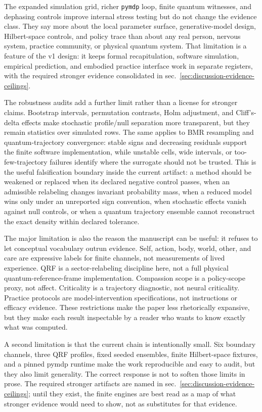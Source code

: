 \documentclass[
]{article}
\begin{document}
The expanded simulation grid, richer \texttt{pymdp} loop, finite quantum
witnesses, and dephasing controls improve internal stress testing but do
not change the evidence class. They say more about the local parameter
surface, generative-model design, Hilbert-space controls, and policy
trace than about any real person, nervous system, practice community, or
physical quantum system. That limitation is a feature of the v1 design:
it keeps formal recapitulation, software simulation, empirical
prediction, and embodied practice interface work in separate registers,
with the required stronger evidence consolidated in
sec.~\ref{sec:discussion-evidence-ceilings}.

The robustness audits add a further limit rather than a license for
stronger claims. Bootstrap intervals, permutation contrasts, Holm
adjustment, and Cliff's-delta effects make stochastic profile/null
separation more transparent, but they remain statistics over simulated
rows. The same applies to BMR resampling and quantum-trajectory
convergence: stable signs and decreasing residuals support the finite
software implementation, while unstable cells, wide intervals, or
too-few-trajectory failures identify where the surrogate should not be
trusted. This is the useful falsification boundary inside the current
artifact: a method should be weakened or replaced when its declared
negative control passes, when an admissible relabeling changes invariant
probability mass, when a reduced model wins only under an unreported
sign convention, when stochastic effects vanish against null controls,
or when a quantum trajectory ensemble cannot reconstruct the exact
density within declared tolerance.

The major limitation is also the reason the manuscript can be useful: it
refuses to let conceptual vocabulary outrun evidence. Self, action,
body, world, other, and care are expressive labels for finite channels,
not measurements of lived experience. QRF is a sector-relabeling
discipline here, not a full physical quantum-reference-frame
implementation. Compassion scope is a policy-scope proxy, not affect.
Criticality is a trajectory diagnostic, not neural criticality. Practice
protocols are model-intervention specifications, not instructions or
efficacy evidence. These restrictions make the paper less rhetorically
expansive, but they make each result inspectable by a reader who wants
to know exactly what was computed.

A second limitation is that the current chain is intentionally small.
Six boundary channels, three QRF profiles, fixed seeded ensembles,
finite Hilbert-space fixtures, and a pinned pymdp runtime make the work
reproducible and easy to audit, but they also limit generality. The
correct response is not to soften those limits in prose. The required
stronger artifacts are named in
sec.~\ref{sec:discussion-evidence-ceilings}; until they exist, the
finite engines are best read as a map of what stronger evidence would
need to show, not as substitutes for that evidence.
\end{document}
